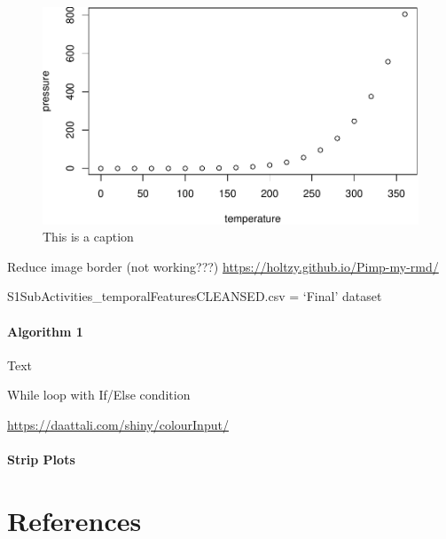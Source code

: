 \documentclass[11pt,]{article}
\let\oldparagraph\paragraph
\renewcommand{\paragraph}[1]{\oldparagraph{#1}\mbox{}}
\begin{document}
\begin{figure}[H]

{\centering \includegraphics{MD_Final_files/figure-latex/fig1-1} 

}

\caption{\label{fig:fig1}This is a caption}\label{fig:fig1}
\end{figure}

Reduce image border (not working???)
\url{https://holtzy.github.io/Pimp-my-rmd/}

S1SubActivities\_temporalFeaturesCLEANSED.csv = `Final' dataset

\hypertarget{algorithm-1}{%
\paragraph{Algorithm 1}\label{algorithm-1}}

Text

\begin{algorithm}[H]
\DontPrintSemicolon
\SetAlgoLined
{}
\BlankLine
{}
\caption{While loop with If/Else condition}
\end{algorithm}

\url{https://daattali.com/shiny/colourInput/}

\hypertarget{strip-plots}{%
\paragraph{Strip Plots}\label{strip-plots}}

\hypertarget{references}{%
\section*{References}\label{references}}
\end{document}
